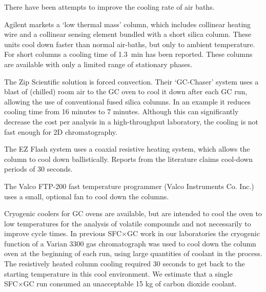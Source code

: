 \documentclass[aip,rsi,preprint,graphicx]{revtex4-1} %
\begin{document}

There have been attempts to improve the cooling rate of air baths.

Agilent\texttrademark{} markets a `low thermal mass' column, which includes
collinear heating wire and a collinear sensing element bundled with a short
silica column. These units cool down faster than normal air-baths, but only to
ambient temperature. For short columns a cooling time of \SI{1.3}{\minute} has
been reported\cite{Luong2006}. These columns are available with only a limited
range of stationary phases.

The Zip Scientific\texttrademark{} solution is forced convection. Their
`GC-Chaser' system\cite{ZipScientific} uses a blast of (chilled) room air to the
GC oven to cool it down after each GC run, allowing the use of conventional
fused silica columns. In an example\cite{ZipScientific2008} it reduces cooling
time from 16 minutes to 7 minutes. Although this can significantly decrease the
cost per analysis in a high-throughput laboratory, the cooling is not fast
enough for 2D chromatography.

The EZ Flash\texttrademark{} system uses a coaxial resistive heating system,
which allows the column to cool down ballistically. Reports from the literature
claims cool-down periods of 30 seconds\cite{Dalluege1999}.

The Valco FTP-200 fast temperature programmer\cite{VICIAGI2019} (Valco
Instruments Co. Inc.) uses a small, optional fan to cool down the columns.

Cryogenic coolers for GC ovens are available, but are intended to cool the oven
to low temperatures for the analysis of volatile compounds and not necessarily
to improve cycle times. In previous SFC×GC work in our
laboratories\cite{Venter2004, Venter2006} the cryogenic function of a Varian
3300 gas chromatograph was used to cool down the column oven at the beginning of
each run, using large quantities of coolant in the process. The resistively
heated column cooling required 30 seconds to get back to the starting
temperature in this cool environment. We estimate that a single SFC×GC
run consumed an unacceptable 15 kg of carbon dioxide coolant.

\end{document}
